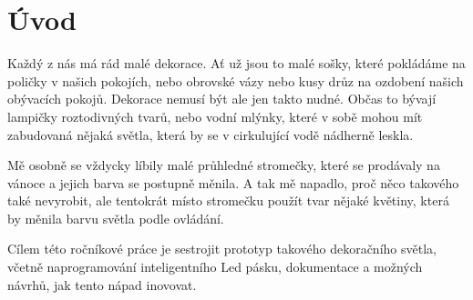 \chapter*{Úvod}

Každý z nás má rád malé dekorace. Ať už jsou to malé sošky, které pokládáme na poličky v našich pokojích, nebo obrovské vázy nebo kusy drůz na ozdobení našich obývacích pokojů. Dekorace nemusí být ale jen takto nudné. Občas to bývají lampičky roztodivných tvarů, nebo vodní mlýnky, které v sobě mohou mít zabudovaná nějaká světla, která by se v cirkulující vodě nádherně leskla.

Mě osobně se vždycky líbily malé průhledné stromečky, které se prodávaly na vánoce a jejich barva se postupně měnila. A tak mě napadlo, proč něco takového také nevyrobit, ale tentokrát místo stromečku použít tvar nějaké květiny, která by měnila barvu světla podle ovládání. %

Cílem této ročníkové práce je sestrojit prototyp takového dekoračního světla, včetně naprogramování inteligentního Led pásku, dokumentace a možných návrhů, jak tento nápad inovovat.

